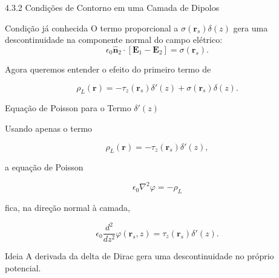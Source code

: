 \documentclass[aspectratio=169]{beamer}
\begin{document}
\begin{frame}{4.3.2 Condições de Contorno em uma Camada de Dipolos}

\begin{mybox}{Condição já conhecida}
O termo proporcional a \(\sigma(\mathbf r_s)\delta(z)\) gera uma descontinuidade na componente normal do campo elétrico:
\[
\epsilon_0\hat{\mathbf n}_2\cdot
\left[\mathbf E_1-\mathbf E_2\right]
=
\sigma(\mathbf r_s).
\]
\end{mybox}

Agora queremos entender o efeito do primeiro termo de

\begin{equation}
\rho_L(\mathbf r)
=
-\tau_z(\mathbf r_s)\delta'(z)
+
\sigma(\mathbf r_s)\delta(z).
\tag{4.41}
\end{equation}

\end{frame}

\begin{frame}{Equação de Poisson para o Termo \(\delta'(z)\)}

Usando apenas o termo

\[
\rho_L(\mathbf r)
=
-\tau_z(\mathbf r_s)\delta'(z),
\]

a equação de Poisson

\[
\epsilon_0\nabla^2\varphi=-\rho_L
\]

fica, na direção normal à camada,

\begin{eqbox}
\begin{equation}
\epsilon_0
\frac{d^2}{dz^2}
\varphi(\mathbf r_s,z)
=
\tau_z(\mathbf r_s)\delta'(z).
\tag{4.43}
\label{eq:4.43}
\end{equation}
\end{eqbox}

\begin{mybox}{Ideia}
A derivada da delta de Dirac gera uma descontinuidade no próprio potencial.
\end{mybox}

\end{frame}
\end{document}
